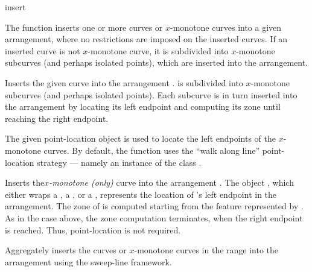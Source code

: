\ccRefPageBegin

\begin{ccRefFunction}{insert}

\ccDefinition

The function \ccRefName{} inserts one or more curves or $x$-monotone curves
into a given arrangement, where no restrictions are imposed on the inserted
curves. If an inserted curve is not $x$-monotone curve, it is subdivided
into $x$-monotone subcurves (and perhaps isolated points), which are
inserted into the arrangement.



Inserts the given curve  into the arrangement .
 is subdivided into $x$-monotone subcurves (and perhaps isolated
points). Each subcurve is in turn inserted into the arrangement by locating
its left endpoint and computing its zone until reaching the right endpoint.

The given point-location object  is used to locate the left
endpoints of the $x$-monotone curves. By default, the function uses the
``walk along line'' point-location strategy --- namely an instance of
the class .


Inserts the{\em $x$-monotone (only)} curve  into the
arrangement . The object , which either
wraps a , a , or a
, represents the location of 's left
endpoint in the arrangement. The zone of  is computed starting
from the feature represented by . As in the case above, the
zone computation terminates, when the right endpoint is reached.
Thus, point-location is not required. 


Aggregately inserts the curves or $x$-monotone curves in the range
\ccc{[first,last)} into the arrangement  using the sweep-line
framework.


\end{ccRefFunction}
